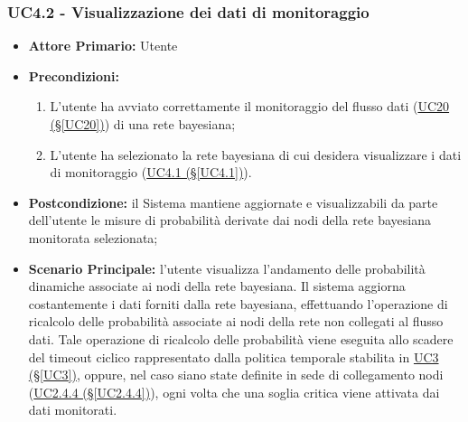 \subsubsection{UC4.2 - Visualizzazione dei dati di monitoraggio}\label{UC4.2}

\begin{itemize}
	\item \textbf{Attore Primario:} Utente
	\item \textbf{Precondizioni:}
	\begin{enumerate}
 		\item L'utente ha avviato correttamente il monitoraggio del flusso dati (\hyperref[UC20]{UC20 (§\ref*{UC20})}) di una rete bayesiana;
 		\item L'utente ha selezionato la rete bayesiana di cui desidera visualizzare i dati di monitoraggio (\hyperref[UC4.1]{UC4.1 (§\ref*{UC4.1})}).
	\end{enumerate}
	\item \textbf{Postcondizione:} il Sistema mantiene aggiornate e visualizzabili da parte dell'utente le misure di probabilità derivate dai nodi della rete bayesiana monitorata selezionata;
	\item \textbf{Scenario Principale:} l'utente visualizza l'andamento delle probabilità dinamiche associate ai nodi della rete bayesiana. Il sistema aggiorna costantemente i dati forniti dalla rete bayesiana, effettuando l'operazione di ricalcolo delle probabilità associate ai nodi della rete non collegati al flusso dati. Tale operazione di ricalcolo delle probabilità viene eseguita allo scadere del timeout ciclico rappresentato dalla politica temporale stabilita in \hyperref[UC3]{UC3 (§\ref*{UC3})}, oppure, nel caso siano state definite in sede di collegamento nodi (\hyperref[UC2.4.4]{UC2.4.4 (§\ref*{UC2.4.4})}), ogni volta che una soglia critica viene attivata dai dati monitorati.
\end{itemize}

\pagebreak

